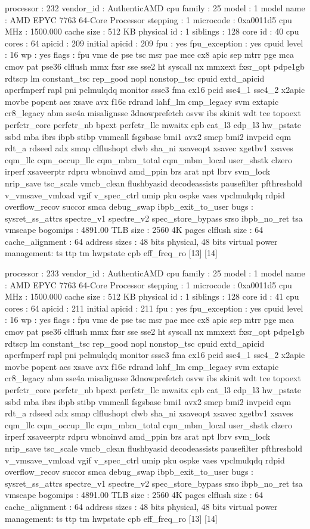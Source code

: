 processor	: 232
vendor_id	: AuthenticAMD
cpu family	: 25
model		: 1
model name	: AMD EPYC 7763 64-Core Processor
stepping	: 1
microcode	: 0xa0011d5
cpu MHz		: 1500.000
cache size	: 512 KB
physical id	: 1
siblings	: 128
core id		: 40
cpu cores	: 64
apicid		: 209
initial apicid	: 209
fpu		: yes
fpu_exception	: yes
cpuid level	: 16
wp		: yes
flags		: fpu vme de pse tsc msr pae mce cx8 apic sep mtrr pge mca cmov pat pse36 clflush mmx fxsr sse sse2 ht syscall nx mmxext fxsr_opt pdpe1gb rdtscp lm constant_tsc rep_good nopl nonstop_tsc cpuid extd_apicid aperfmperf rapl pni pclmulqdq monitor ssse3 fma cx16 pcid sse4_1 sse4_2 x2apic movbe popcnt aes xsave avx f16c rdrand lahf_lm cmp_legacy svm extapic cr8_legacy abm sse4a misalignsse 3dnowprefetch osvw ibs skinit wdt tce topoext perfctr_core perfctr_nb bpext perfctr_llc mwaitx cpb cat_l3 cdp_l3 hw_pstate ssbd mba ibrs ibpb stibp vmmcall fsgsbase bmi1 avx2 smep bmi2 invpcid cqm rdt_a rdseed adx smap clflushopt clwb sha_ni xsaveopt xsavec xgetbv1 xsaves cqm_llc cqm_occup_llc cqm_mbm_total cqm_mbm_local user_shstk clzero irperf xsaveerptr rdpru wbnoinvd amd_ppin brs arat npt lbrv svm_lock nrip_save tsc_scale vmcb_clean flushbyasid decodeassists pausefilter pfthreshold v_vmsave_vmload vgif v_spec_ctrl umip pku ospke vaes vpclmulqdq rdpid overflow_recov succor smca debug_swap ibpb_exit_to_user
bugs		: sysret_ss_attrs spectre_v1 spectre_v2 spec_store_bypass srso ibpb_no_ret tsa vmscape
bogomips	: 4891.00
TLB size	: 2560 4K pages
clflush size	: 64
cache_alignment	: 64
address sizes	: 48 bits physical, 48 bits virtual
power management: ts ttp tm hwpstate cpb eff_freq_ro [13] [14]

processor	: 233
vendor_id	: AuthenticAMD
cpu family	: 25
model		: 1
model name	: AMD EPYC 7763 64-Core Processor
stepping	: 1
microcode	: 0xa0011d5
cpu MHz		: 1500.000
cache size	: 512 KB
physical id	: 1
siblings	: 128
core id		: 41
cpu cores	: 64
apicid		: 211
initial apicid	: 211
fpu		: yes
fpu_exception	: yes
cpuid level	: 16
wp		: yes
flags		: fpu vme de pse tsc msr pae mce cx8 apic sep mtrr pge mca cmov pat pse36 clflush mmx fxsr sse sse2 ht syscall nx mmxext fxsr_opt pdpe1gb rdtscp lm constant_tsc rep_good nopl nonstop_tsc cpuid extd_apicid aperfmperf rapl pni pclmulqdq monitor ssse3 fma cx16 pcid sse4_1 sse4_2 x2apic movbe popcnt aes xsave avx f16c rdrand lahf_lm cmp_legacy svm extapic cr8_legacy abm sse4a misalignsse 3dnowprefetch osvw ibs skinit wdt tce topoext perfctr_core perfctr_nb bpext perfctr_llc mwaitx cpb cat_l3 cdp_l3 hw_pstate ssbd mba ibrs ibpb stibp vmmcall fsgsbase bmi1 avx2 smep bmi2 invpcid cqm rdt_a rdseed adx smap clflushopt clwb sha_ni xsaveopt xsavec xgetbv1 xsaves cqm_llc cqm_occup_llc cqm_mbm_total cqm_mbm_local user_shstk clzero irperf xsaveerptr rdpru wbnoinvd amd_ppin brs arat npt lbrv svm_lock nrip_save tsc_scale vmcb_clean flushbyasid decodeassists pausefilter pfthreshold v_vmsave_vmload vgif v_spec_ctrl umip pku ospke vaes vpclmulqdq rdpid overflow_recov succor smca debug_swap ibpb_exit_to_user
bugs		: sysret_ss_attrs spectre_v1 spectre_v2 spec_store_bypass srso ibpb_no_ret tsa vmscape
bogomips	: 4891.00
TLB size	: 2560 4K pages
clflush size	: 64
cache_alignment	: 64
address sizes	: 48 bits physical, 48 bits virtual
power management: ts ttp tm hwpstate cpb eff_freq_ro [13] [14]

